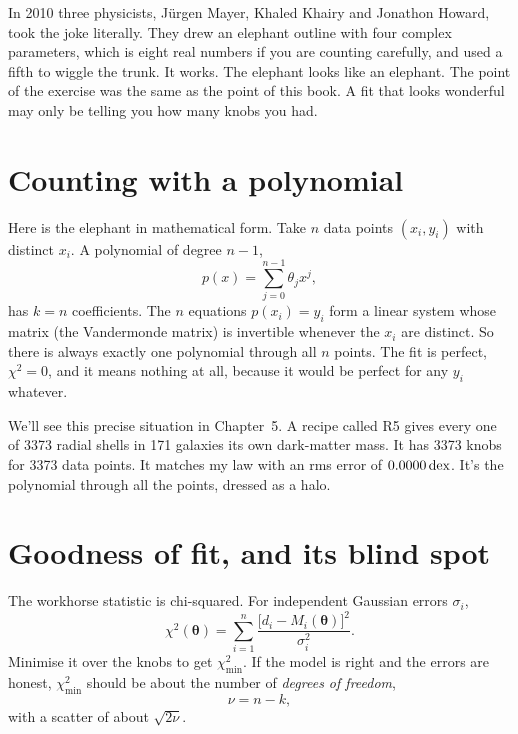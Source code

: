 In 2010 three physicists, J\"urgen Mayer, Khaled Khairy and Jonathon Howard, took the joke literally. They drew an elephant outline with four complex parameters, which is eight real numbers if you are counting carefully, and used a fifth to wiggle the trunk. It works. The elephant looks like an elephant. The point of the exercise was the same as the point of this book. A fit that looks wonderful may only be telling you how many knobs you had.

\section{Counting with a polynomial}

Here is the elephant in mathematical form. Take $n$ data points $(x_i,y_i)$ with distinct $x_i$. A polynomial of degree $n-1$,
\begin{equation}
p(x)=\sum_{j=0}^{n-1}\theta_j x^j,
\end{equation}
has $k=n$ coefficients. The $n$ equations $p(x_i)=y_i$ form a linear system whose matrix (the Vandermonde matrix) is invertible whenever the $x_i$ are distinct. So there is always exactly one polynomial through all $n$ points. The fit is perfect, $\chi^2=0$, and it means nothing at all, because it would be perfect for any $y_i$ whatever.

We'll see this precise situation in Chapter~5. A recipe called R5 gives every one of 3373 radial shells in 171 galaxies its own dark-matter mass. It has 3373 knobs for 3373 data points. It matches my law with an rms error of $0.0000\,\mathrm{dex}$. It's the polynomial through all the points, dressed as a halo.



\section{Goodness of fit, and its blind spot}

The workhorse statistic is chi-squared. For independent Gaussian errors $\sigma_i$,
\begin{equation}
\chi^2(\boldsymbol\theta)=\sum_{i=1}^{n}\frac{\bigl[d_i-M_i(\boldsymbol\theta)\bigr]^2}{\sigma_i^2}.
\end{equation}
Minimise it over the knobs to get $\chi^2_{\min}$. If the model is right and the errors are honest, $\chi^2_{\min}$ should be about the number of \emph{degrees of freedom},
\begin{equation}
\nu=n-k,
\end{equation}
with a scatter of about $\sqrt{2\nu}$.

